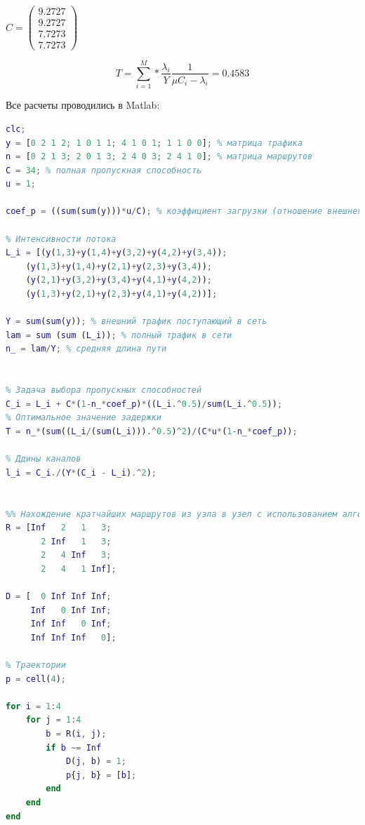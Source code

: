 \documentclass[14pt,a4paper,report]{report}
\begin{document}
$C = \begin{pmatrix} 
9.2727 \\
9.2727 \\
7.7273 \\
7.7273
\end{pmatrix}
\quad$



$$ T = \sum_{i=1}^M* \frac{\lambda_i}{Y} \frac{1}{\mu C_i-\lambda_i }=0.4583  $$















Все расчеты проводились в Matlab:
\begin{lstlisting}[language={matlab}, caption={Скрипт}, basicstyle=\ttfamily]
clc;
y = [0 2 1 2; 1 0 1 1; 4 1 0 1; 1 1 0 0]; % матрица трафика
n = [0 2 1 3; 2 0 1 3; 2 4 0 3; 2 4 1 0]; % матрица маршрутов
C = 34; % полная пропускная способность
u = 1;

coef_p = ((sum(sum(y)))*u/C); % коэффициент загрузки (отношение внешнего траффика в битах от суммарной пропускной способности)

% Интенсивности потока
L_i = [(y(1,3)+y(1,4)+y(3,2)+y(4,2)+y(3,4));
    (y(1,3)+y(1,4)+y(2,1)+y(2,3)+y(3,4));
    (y(2,1)+y(3,2)+y(3,4)+y(4,1)+y(4,2));
    (y(1,3)+y(2,1)+y(2,3)+y(4,1)+y(4,2))];

Y = sum(sum(y)); % внешний трафик поступающий в сеть
lam = sum (sum (L_i)); % полный трафик в сети
n_ = lam/Y; % средняя длина пути


% Задача выбора пропускных способностей
C_i = L_i + C*(1-n_*coef_p)*((L_i.^0.5)/sum(L_i.^0.5));
% Оптимальное значение задержки
T = n_*(sum((L_i/(sum(L_i))).^0.5)^2)/(C*u*(1-n_*coef_p));

% Ддины каналов
l_i = C_i./(Y*(C_i - L_i).^2);


%% Нахождение кратчайших маршрутов из узла в узел с использованием алгоритма Флойда
R = [Inf   2   1   3;
       2 Inf   1   3;
       2   4 Inf   3;
       2   4   1 Inf];
   
D = [  0 Inf Inf Inf;
     Inf   0 Inf Inf;
     Inf Inf   0 Inf;
     Inf Inf Inf   0];
 
% Траектории 
p = cell(4);

for i = 1:4
    for j = 1:4
        b = R(i, j);
        if b ~= Inf
            D(j, b) = 1;
            p{j, b} = [b];
        end
    end 
end


\end{lstlisting}
\end{document}
